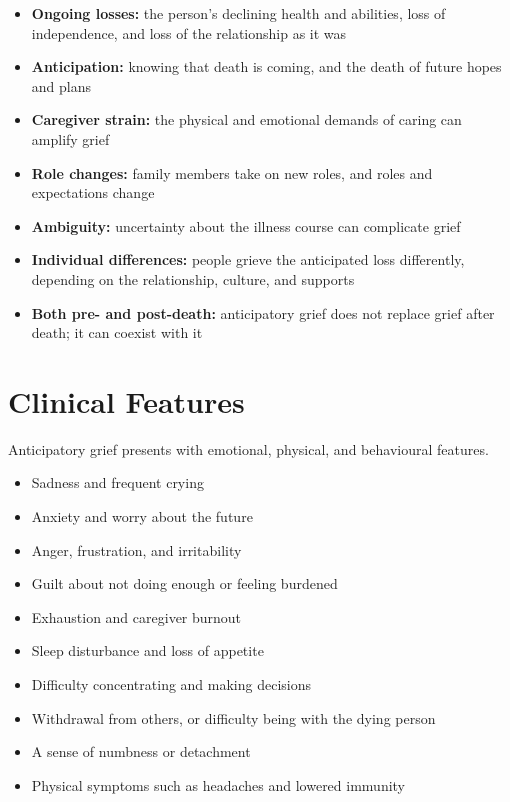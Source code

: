 \begin{itemize}
    \item \textbf{Ongoing losses:} the person's declining health and abilities, loss of independence, and loss of the relationship as it was
    \item \textbf{Anticipation:} knowing that death is coming, and the death of future hopes and plans
    \item \textbf{Caregiver strain:} the physical and emotional demands of caring can amplify grief
    \item \textbf{Role changes:} family members take on new roles, and roles and expectations change
    \item \textbf{Ambiguity:} uncertainty about the illness course can complicate grief
    \item \textbf{Individual differences:} people grieve the anticipated loss differently, depending on the relationship, culture, and supports
    \item \textbf{Both pre- and post-death:} anticipatory grief does not replace grief after death; it can coexist with it
\end{itemize}

\section*{Clinical Features}
Anticipatory grief presents with emotional, physical, and behavioural features.

\begin{itemize}
    \item Sadness and frequent crying
    \item Anxiety and worry about the future
    \item Anger, frustration, and irritability
    \item Guilt about not doing enough or feeling burdened
    \item Exhaustion and caregiver burnout
    \item Sleep disturbance and loss of appetite
    \item Difficulty concentrating and making decisions
    \item Withdrawal from others, or difficulty being with the dying person
    \item A sense of numbness or detachment
    \item Physical symptoms such as headaches and lowered immunity
\end{itemize}

